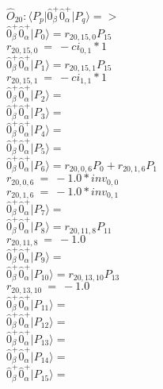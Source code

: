 \documentclass[14pt]{article}
\begin{document}
    $\hat{O}_{20}:  \langle{P_p}\vert \hat{0}_{\beta}^{+}\hat{0}_{\alpha}^{+} \vert{P_q}\rangle => $ \\ 
    $ \hat{0}_{\beta}^{+}\hat{0}_{\alpha}^{+} \vert{P_{0}}\rangle = {r}_{20,15,0}P_{15} $ \\ 
    ${r}_{20,15,0}\ =\ -{ci}_{0,1}*1 $ \\ 
    $ \hat{0}_{\beta}^{+}\hat{0}_{\alpha}^{+} \vert{P_{1}}\rangle = {r}_{20,15,1}P_{15} $ \\ 
    ${r}_{20,15,1}\ =\ -{ci}_{1,1}*1 $ \\ 
    $ \hat{0}_{\beta}^{+}\hat{0}_{\alpha}^{+} \vert{P_{2}}\rangle =  $ \\ 
    $ \hat{0}_{\beta}^{+}\hat{0}_{\alpha}^{+} \vert{P_{3}}\rangle =  $ \\ 
    $ \hat{0}_{\beta}^{+}\hat{0}_{\alpha}^{+} \vert{P_{4}}\rangle =  $ \\ 
    $ \hat{0}_{\beta}^{+}\hat{0}_{\alpha}^{+} \vert{P_{5}}\rangle =  $ \\ 
    $ \hat{0}_{\beta}^{+}\hat{0}_{\alpha}^{+} \vert{P_{6}}\rangle = {r}_{20,0,6}P_{0}+{r}_{20,1,6}P_{1} $ \\ 
    ${r}_{20,0,6}\ =\ -1.0*{inv}_{0,0} $ \\ 
    ${r}_{20,1,6}\ =\ -1.0*{inv}_{0,1} $ \\ 
    $ \hat{0}_{\beta}^{+}\hat{0}_{\alpha}^{+} \vert{P_{7}}\rangle =  $ \\ 
    $ \hat{0}_{\beta}^{+}\hat{0}_{\alpha}^{+} \vert{P_{8}}\rangle = {r}_{20,11,8}P_{11} $ \\ 
    ${r}_{20,11,8}\ =\ -1.0 $ \\ 
    $ \hat{0}_{\beta}^{+}\hat{0}_{\alpha}^{+} \vert{P_{9}}\rangle =  $ \\ 
    $ \hat{0}_{\beta}^{+}\hat{0}_{\alpha}^{+} \vert{P_{10}}\rangle = {r}_{20,13,10}P_{13} $ \\ 
    ${r}_{20,13,10}\ =\ -1.0 $ \\ 
    $ \hat{0}_{\beta}^{+}\hat{0}_{\alpha}^{+} \vert{P_{11}}\rangle =  $ \\ 
    $ \hat{0}_{\beta}^{+}\hat{0}_{\alpha}^{+} \vert{P_{12}}\rangle =  $ \\ 
    $ \hat{0}_{\beta}^{+}\hat{0}_{\alpha}^{+} \vert{P_{13}}\rangle =  $ \\ 
    $ \hat{0}_{\beta}^{+}\hat{0}_{\alpha}^{+} \vert{P_{14}}\rangle =  $ \\ 
    $ \hat{0}_{\beta}^{+}\hat{0}_{\alpha}^{+} \vert{P_{15}}\rangle =  $ \\ 
    
\end{document}
